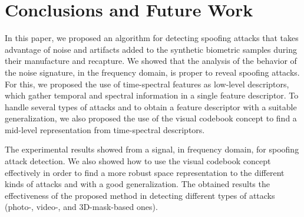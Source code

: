 \section{Conclusions and Future Work}\label{sec:conclusions}
In this paper, we proposed an algorithm for detecting spoofing attacks that takes advantage of noise and artifacts added to the synthetic biometric samples during their manufacture and recapture. We showed that the analysis of the behavior of the noise signature, in the frequency domain, is proper to reveal spoofing attacks. For this, we proposed the use of time-spectral features as low-level descriptors, which gather temporal and spectral information in a single feature descriptor. To handle several types of attacks and to obtain a feature descriptor with a suitable generalization, we also proposed the use of the visual codebook concept to find a mid-level representation from time-spectral descriptors. 

The experimental results showed  from a signal, in frequency domain, for spoofing attack detection. We also showed how to use the visual codebook concept effectively in order to find a more robust space representation to the different kinds of attacks and with a good generalization. The obtained results  the effectiveness of the proposed method in detecting different types of attacks (photo-, video-, and 3D-mask-based ones).



